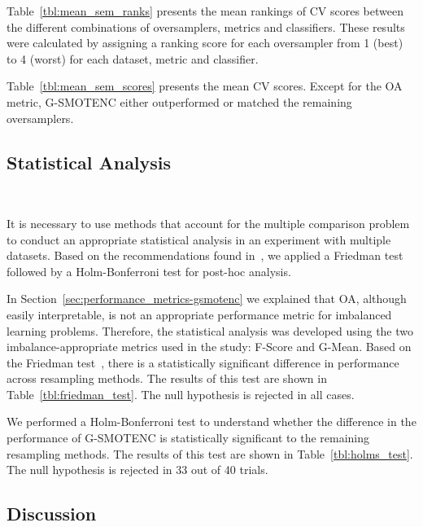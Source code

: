 Table~\ref{tbl:mean_sem_ranks} presents the mean rankings of CV scores between
the different combinations of oversamplers, metrics and classifiers. These
results were calculated by assigning a ranking score for each oversampler from
1 (best) to 4 (worst) for each dataset, metric and classifier.

\begingroup\small
{\setlength{\tabcolsep}{5pt}

}
\endgroup

Table~\ref{tbl:mean_sem_scores} presents the mean CV scores. Except for the
OA metric, G-SMOTENC either outperformed or matched the remaining
oversamplers.

\begingroup\small
{\setlength{\tabcolsep}{4.8pt}

}
\endgroup

\subsection{Statistical Analysis}~\label{sec:statistical_analysis-gsmotenc}

It is necessary to use methods that account for the multiple comparison
problem to conduct an appropriate statistical analysis in an experiment with
multiple datasets. Based on the recommendations found in~\cite{Demsar2006}, we
applied a Friedman test followed by a Holm-Bonferroni test for post-hoc
analysis.

In Section~\ref{sec:performance_metrics-gsmotenc} we explained that OA, although easily
interpretable, is not an appropriate performance metric for imbalanced
learning problems. Therefore, the statistical analysis was developed using the
two imbalance-appropriate metrics used in the study: F-Score and G-Mean. Based
on the Friedman test~\cite{Friedman1937}, there is a statistically
significant difference in performance across resampling methods. The results
of this test are shown in Table~\ref{tbl:friedman_test}. The null hypothesis
is rejected in all cases.



We performed a Holm-Bonferroni test to understand whether the difference in
the performance of G-SMOTENC is statistically significant to the remaining
resampling methods. The results of this test are shown in
Table~\ref{tbl:holms_test}. The null hypothesis is rejected in 33 out of 40
trials.



\subsection{Discussion}~\label{sec:discussion-gsmotenc}

